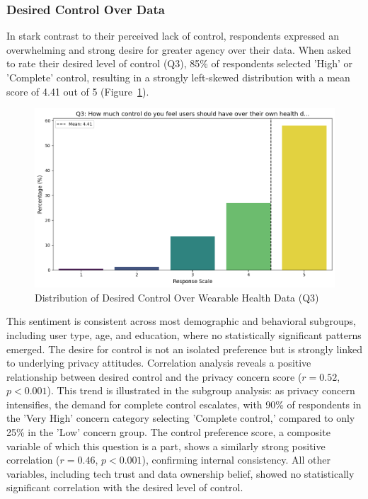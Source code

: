 	\subsubsection{Desired Control Over Data}
		In stark contrast to their perceived lack of control, respondents expressed an overwhelming and strong desire for greater agency over their data. When asked to rate their desired level of control (Q3), 85\% of respondents selected 'High' or 'Complete' control, resulting in a strongly left-skewed distribution with a mean score of 4.41 out of 5 (Figure~\ref{fig:desired_control_q3}). 
		\begin{figure}[ht]\centering
			\includegraphics[width=1\linewidth]{figures/questions/Q3_likert.png}
			\caption{Distribution of Desired Control Over Wearable Health Data (Q3)}
			\label{fig:desired_control_q3}
		\end{figure}
		This sentiment is consistent across most demographic and behavioral subgroups, including user type, age, and education, where no statistically significant patterns emerged.
		The desire for control is not an isolated preference but is strongly linked to underlying privacy attitudes. Correlation analysis reveals a positive relationship between desired control and the privacy concern score ($r = 0.52$, $p < 0.001$). This trend is illustrated in the subgroup analysis: as privacy concern intensifies, the demand for complete control escalates, with 90\% of respondents in the 'Very High' concern category selecting 'Complete control,' compared to only 25\% in the 'Low' concern group. The control preference score, a composite variable of which this question is a part, shows a similarly strong positive correlation ($r = 0.46$, $p < 0.001$), confirming internal consistency. All other variables, including tech trust and data ownership belief, showed no statistically significant correlation with the desired level of control.
